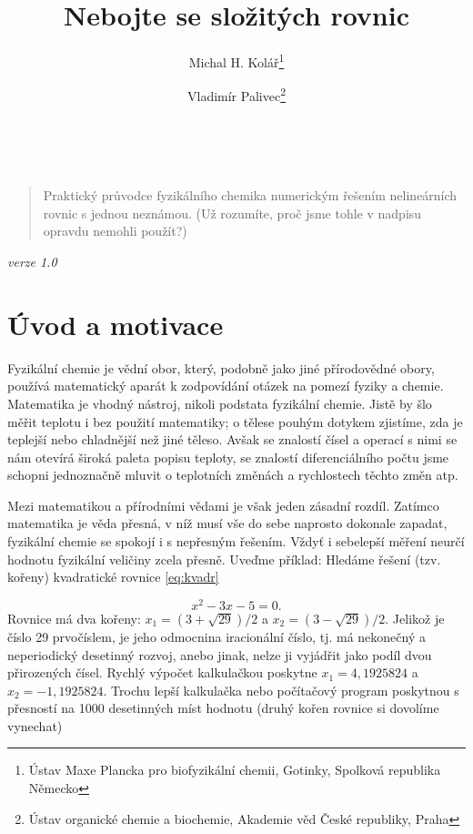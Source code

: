 \documentclass[a4paper,oneside,12pt]{article}
\title{\textbf{Nebojte se složitých rovnic}}
\author{
Michal H. Kolář\footnote{Ústav Maxe Plancka
pro biofyzikální chemii,
Gotinky, Spolková republika Německo}
\and
Vladimír Palivec\footnote{Ústav organické 
chemie a biochemie, Akademie věd České 
republiky, Praha}}
\date{~}
\begin{document}
\maketitle


\begin{quote}
Praktický průvodce fyzikálního chemika
numerickým řešením nelineárních rovnic s jednou
neznámou. (Už rozumíte, proč jsme tohle v nadpisu
opravdu nemohli použít?)
\end{quote}

\begin{center}
\emph{verze 1.0}
\end{center}

\tableofcontents

\newpage

\section{Úvod a motivace}

Fyzikální chemie je vědní obor, který, podobně jako
jiné přírodovědné obory, používá matematický aparát
k zodpovídání otázek na pomezí fyziky a chemie. 
Matematika je vhodný nástroj, nikoli podstata fyzikální
chemie. Jistě by šlo měřit teplotu i bez použití 
matematiky; o tělese pouhým dotykem zjistíme,
zda je teplejší nebo chladnější než jiné těleso. Avšak
se znalostí čísel a operací s nimi se nám otevírá široká 
paleta popisu teploty, se znalostí diferenciálního počtu 
jsme schopni jednoznačně mluvit o teplotních změnách a 
rychlostech těchto změn atp.

Mezi matematikou a přírodními vědami je však jeden zásadní 
rozdíl. Zatímco matematika je věda přesná, v níž musí vše 
do sebe naprosto dokonale zapadat, fyzikální chemie se 
spokojí i s nepřesným řešením. Vždyť i sebelepší měření
neurčí hodnotu fyzikální veličiny zcela přesně.
Uveďme příklad: Hledáme řešení (tzv. kořeny) kvadratické 
rovnice \ref{eq:kvadr}

\begin{equation}
x^2 - 3x - 5 = 0.
\label{eq:kvadr}
\end{equation}
%
Rovnice má dva kořeny: $x_1 = (3 + \sqrt{29}) / 2$
a $x_2 = (3 - \sqrt{29}) / 2$. Jelikož je číslo 29 prvočíslem,
je jeho odmocnina iracionální číslo, tj. má nekonečný 
a neperiodický desetinný rozvoj, anebo jinak, nelze ji 
vyjádřit jako podíl dvou přirozených čísel. Rychlý výpočet
kalkulačkou poskytne $x_1=4,1925824$ a $x_2=-1,1925824$. 
Trochu lepší kalkulačka nebo počítačový program poskytnou
s přesností na 1000 desetinných míst hodnotu (druhý kořen
rovnice si dovolíme vynechat)
\end{document}
